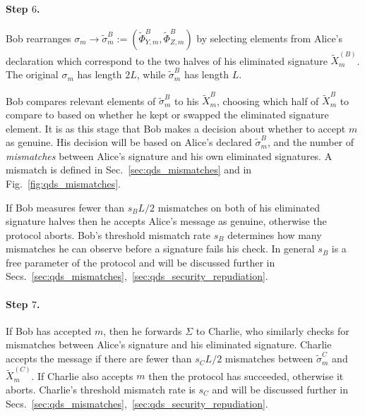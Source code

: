 \paragraph{Step $6$.} Bob rearranges $\sigma_m \rightarrow \tilde{\sigma}_m^B := \left(\tilde{\Phi}_{Y, m}^B, \tilde{\Phi}_{Z, m}^B\right)$ by selecting elements from Alice's declaration which correspond to the two halves of his eliminated signature $\tilde{X}_m^{\left(B\right)}$. The original $\sigma_m$ has length $2 L$, while $\tilde{\sigma}_m^B$ has length $L$.

Bob compares relevant elements of $\tilde{\sigma}_m^B$ to his $\tilde{X}_m^{B}$, choosing which half of $\tilde{X}_m^B$ to compare to based on whether he kept or swapped the eliminated signature element. It is as this stage that Bob makes a decision about whether to accept $m$ as genuine. His decision will be based on Alice's declared $\tilde{\sigma}_m^B$, and the number of \emph{mismatches} between Alice's signature and his own eliminated signatures. A mismatch is defined in Sec.~\ref{sec:qds_mismatches} and in Fig.~\ref{fig:qds_mismatches}.


If Bob measures fewer than $s_B L/2$ mismatches on both of his eliminated signature halves then he accepts Alice's message as genuine, otherwise the protocol aborts. Bob's threshold mismatch rate $s_B$ determines how many mismatches he can observe before a signature fails his check. In general $s_B$ is a free parameter of the protocol and will be discussed further in Secs.~\ref{sec:qds_mismatches},~\ref{sec:qds_security_repudiation}.


\paragraph{Step $7$.} If Bob has accepted $m$, then he forwards $\Sigma$ to Charlie, who similarly checks for mismatches between Alice's signature and his eliminated signature. Charlie accepts the message if %
there are fewer than $s_C L/2$  mismatches between $\tilde{\sigma}_m^C$ and $\tilde{X}_m^{\left(C\right)}$. If Charlie also accepts $m$ then the protocol has succeeded, otherwise it aborts.  Charlie's threshold mismatch rate is $s_C$ and will be discussed further in Secs.~\ref{sec:qds_mismatches},~\ref{sec:qds_security_repudiation}.

